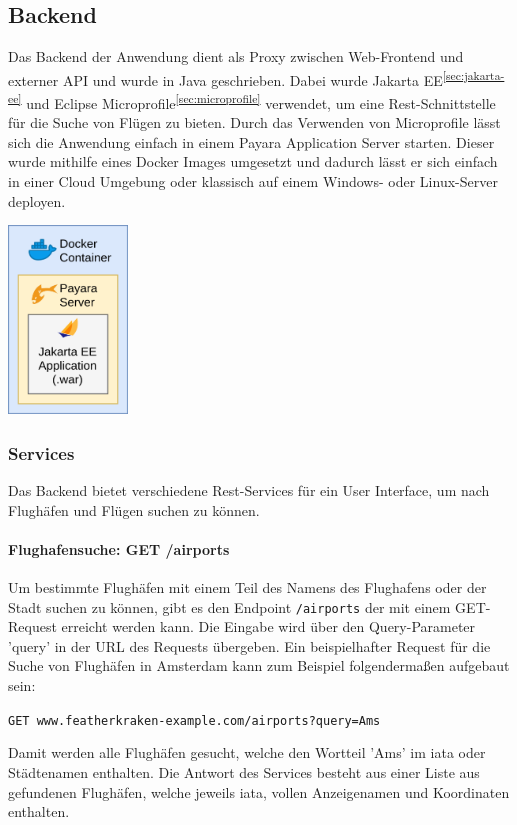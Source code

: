 \documentclass[12pt,twoside,a4paper]{article}
\begin{document}
\subsection{Backend}
Das Backend der Anwendung dient als Proxy zwischen Web-Frontend und externer API und wurde in Java geschrieben. Dabei wurde Jakarta EE\textsuperscript{\ref{sec:jakarta-ee}} und Eclipse Microprofile\textsuperscript{\ref{sec:microprofile}} verwendet, um eine Rest-Schnittstelle für die Suche von Flügen zu bieten. Durch das Verwenden von Microprofile lässt sich die Anwendung einfach in einem Payara Application Server starten. Dieser wurde mithilfe eines Docker Images umgesetzt und dadurch lässt er sich einfach in einer Cloud Umgebung oder klassisch auf einem Windows- oder Linux-Server deployen.
\begin{center}
	\captionsetup{type=figure}
	\includegraphics[height=5cm]{images/backend-structure}
\end{center}
\subsubsection{Services}
Das Backend bietet verschiedene Rest-Services für ein User Interface, um nach Flughäfen und Flügen suchen zu können.
\paragraph[Flughafensuche]{Flughafensuche: GET /airports}\label{sec:airport-search}
Um bestimmte Flughäfen mit einem Teil des Namens des Flughafens oder der Stadt suchen zu können, gibt es den Endpoint \texttt{/airports} der mit einem GET-Request erreicht werden kann. Die Eingabe wird über den Query-Parameter 'query' in der URL des Requests übergeben. Ein beispielhafter Request für die Suche von Flughäfen in Amsterdam kann zum Beispiel folgendermaßen aufgebaut sein:\\
\begin{center}
	\texttt{GET www.featherkraken-example.com/airports?query=Ams}
\end{center}
Damit werden alle Flughäfen gesucht, welche den Wortteil 'Ams' im \acrlong{iata} oder Städtenamen enthalten. Die Antwort des Services besteht aus einer Liste aus gefundenen Flughäfen, welche jeweils \acrlong{iata}, vollen Anzeigenamen und Koordinaten enthalten.
\end{document}
